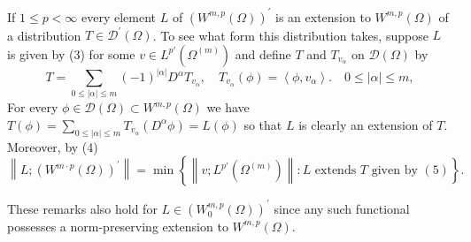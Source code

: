 \begin{para}
  If $1 \leq p<\infty$ every element $L$ of $\left(W^{m, p}(\Omega)\right)^{\prime}$ is an 
  extension to $W^{m, p}(\Omega)$ of a distribution $T \in \mathscr{D}^{\prime}(\Omega)$. To see what form this distribution takes, suppose $L$ is given by (3) for some $v \in L^{p'}(\Omega^{(m)})$ and define $T$ and $T_{v_\alpha}$ on $\mathscr{D}(\Omega)$ by
  \begin{equation}\label{eq:3.5}
    T=\sum_{0 \leq|\alpha| \leq m}(-1)^{|\alpha|} D^\alpha T_{v_\alpha}, \quad T_{v_\alpha}(\phi)=\left\langle\phi, v_\alpha\right\rangle . \quad 0 \leq|\alpha| \leq m,
  \end{equation}
  For every $\phi \in \mathscr{D}(\Omega) \subset W^{m, p}(\Omega)$ we have $T(\phi)=\sum_{0 \leq|\alpha| \leq m} T_{v_\alpha}\left(D^\alpha \phi\right)=L(\phi)$ so that $L$ is clearly an extension of $T$. Moreover, by (4)
  \[
  \left\|L ;\left(W^{m \cdot p}(\Omega)\right)^{\prime}\right\|=\min \left\{\left\|v ; L^{p'}(\Omega^{(m)})\right\|: L \text { extends } T \text { given by }(5)\right\} .
  \]
\end{para}

These remarks also hold for $L \in\left(W_0^{m, p}(\Omega)\right)^{\prime}$ since any such functional possesses a norm-preserving extension to $W^{m, p}(\Omega)$.


